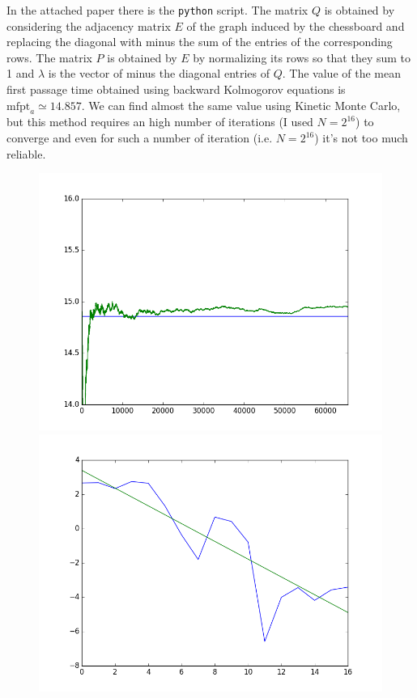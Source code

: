 \documentclass[a4paper,11pt]{article}
\theoremstyle{definition}
\theoremstyle{plain}
\theoremstyle{remark}
\begin{document}
In the attached paper there is the \texttt{python} script. The matrix $Q$ is obtained by considering the adjacency matrix $E$ of the graph induced by the chessboard and replacing the diagonal with minus the sum of the entries of the corresponding rows. The matrix $P$ is obtained by $E$ by normalizing its rows so that they sum to 1 and $\lambda$ is the vector of minus the diagonal entries of $Q$. The value of the mean first passage time obtained using backward Kolmogorov equations is $\mathrm{mfpt}_a\simeq 14.857$. We can find almost the same value using Kinetic Monte Carlo, but this method requires an high number of iterations (I used $N=2^{16}$) to converge and even for such a number of iteration (i.e. $N=2^{16}$) it's not too much reliable. 
\begin{figure}[htbp]
\centering
\begin{minipage}[c]{.47\textwidth}
\includegraphics[width=\textwidth,
keepaspectratio]{ex4.png}
\end{minipage}
\hspace{4mm}
\begin{minipage}[c]{.47\textwidth}
\includegraphics[width=\textwidth,
keepaspectratio]{ex4_1.png}
\end{minipage}
\caption{ \label{figure:ex6}}
\end{figure}
\end{document}
